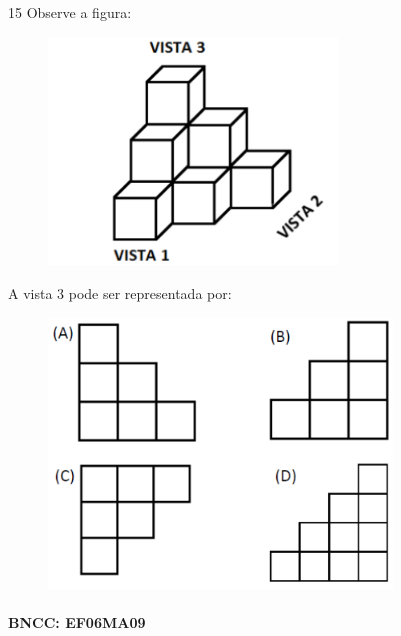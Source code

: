 {\num{15} Observe a figura:

\begin{figure}
\includegraphics[width=3.01693in,height=2.38354in]{./imgSAEB_6_MAT/media/image112.png}
\end{figure}

A vista $3$ pode ser representada por:

\begin{figure}
\includegraphics[width=3.59198in,height=2.82524in]{./imgSAEB_6_MAT/media/image113.png}
\end{figure}

\paragraph{BNCC: EF06MA09 }


}
